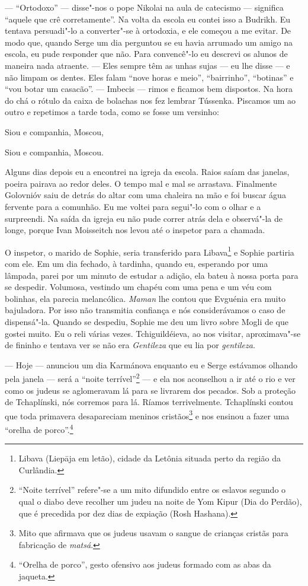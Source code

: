 --- ``Ortodoxo'' --- disse"-nos o pope Nikolai na aula de catecismo ---
significa ``aquele que crê corretamente''. Na volta da escola eu contei
isso a Budrikh. Eu tentava persuadi"-lo a converter"-se à ortodoxia, e ele
começou a me evitar. De modo que, quando Serge um dia perguntou se eu
havia arrumado um amigo na escola, eu pude responder que não. Para
convencê"-lo eu descrevi os alunos de maneira nada atraente. --- Eles
sempre têm as unhas sujas --- eu lhe disse --- e não limpam os dentes.
Eles falam ``nove horas e meio'', ``bairrinho'', ``botinas'' e ``vou
botar um casacão''. --- Imbecis --- rimos e ficamos bem dispostos. Na
hora do chá o rótulo da caixa de bolachas nos fez lembrar Tússenka.
Piscamos um ao outro e repetimos a tarde toda, como se fosse um
versinho:

Siou e companhia, Moscou,

Siou e companhia, Moscou.

Alguns dias depois eu a encontrei na igreja da escola. Raios saíam das
janelas, poeira pairava ao redor deles. O tempo mal e mal se arrastava.
Finalmente Golovnióv saiu de detrás do altar com uma chaleira na mão e
foi buscar água fervente para a comunhão. Eu me voltei para segui"-lo com
o olhar e a surpreendi. Na saída da igreja eu não pude correr atrás dela
e observá"-la de longe, porque Ivan Moisseitch nos levou até o inspetor
para a chamada.

O inspetor, o marido de Sophie, seria transferido para Libava\footnote{Libava
  (Liepāja em letão), cidade da Letônia situada perto da região da
  Curlândia.} e Sophie partiria com ele. Em um dia fechado, à tardinha,
quando eu, esperando por uma lâmpada, parei por um minuto de estudar a
adição, ela bateu à nossa porta para se despedir. Volumosa, vestindo um
chapéu com uma pena e um véu com bolinhas, ela parecia melancólica.
\emph{Maman} lhe contou que Evguénia era muito bajuladora. Por isso não
transmitia confiança e nós considerávamos o caso de dispensá"-la. Quando
se despediu, Sophie me deu um livro sobre Mogli de que gostei muito. Eu
o reli várias vezes. Tchiguildéieva, ao nos visitar, aproximava"-se de
fininho e tentava ver se não era \emph{Gentileza} que eu lia por
\emph{gentileza}.

--- Hoje --- anunciou um dia Karmánova enquanto eu e Serge estávamos
olhando pela janela --- será a ``noite terrível''\footnote{``Noite
  terrível'' refere"-se a um mito difundido entre os eslavos segundo o
  qual o diabo deve recolher um judeu na noite de Yom Kipur (Dia do
  Perdão), que é precedida por dez dias de expiação (Rosh Hashana).} ---
e ela nos aconselhou a ir até o rio e ver como os judeus se aglomeravam
lá para se livrarem dos pecados. Sob a proteção de Tchaplínski, nós
corremos para lá. Ríamos terrivelmente. Tchaplínski contou que toda
primavera desapareciam meninos cristãos\footnote{Mito que afirmava que
  os judeus usavam o sangue de crianças cristãs para fabricação de
  \emph{matsá}.} e nos ensinou a fazer uma ``orelha de
porco''.\footnote{``Orelha de porco'', gesto ofensivo aos judeus formado
  com as abas da jaqueta.}

